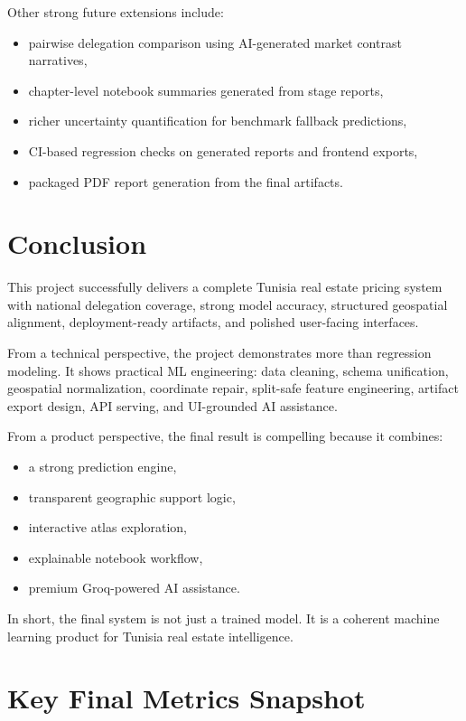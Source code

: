 \documentclass[11pt,a4paper]{article}
\begin{document}
Other strong future extensions include:

\begin{itemize}
\item pairwise delegation comparison using AI-generated market contrast narratives,
\item chapter-level notebook summaries generated from stage reports,
\item richer uncertainty quantification for benchmark fallback predictions,
\item CI-based regression checks on generated reports and frontend exports,
\item packaged PDF report generation from the final artifacts.
\end{itemize}

\section{Conclusion}

This project successfully delivers a complete Tunisia real estate pricing system with national delegation coverage, strong model accuracy, structured geospatial alignment, deployment-ready artifacts, and polished user-facing interfaces.

From a technical perspective, the project demonstrates more than regression modeling. It shows practical ML engineering: data cleaning, schema unification, geospatial normalization, coordinate repair, split-safe feature engineering, artifact export design, API serving, and UI-grounded AI assistance.

From a product perspective, the final result is compelling because it combines:

\begin{itemize}
\item a strong prediction engine,
\item transparent geographic support logic,
\item interactive atlas exploration,
\item explainable notebook workflow,
\item premium Groq-powered AI assistance.
\end{itemize}

In short, the final system is not just a trained model. It is a coherent machine learning product for Tunisia real estate intelligence.

\appendix

\section{Key Final Metrics Snapshot}
\end{document}
